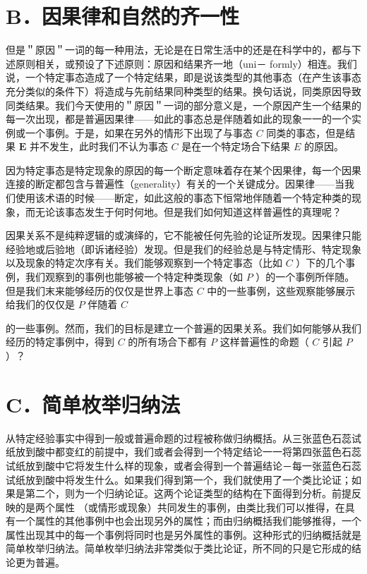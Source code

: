 \section*{B．因果律和自然的齐一性}
但是＂原因＂一词的每一种用法，无论是在日常生活中的还是在科学中的，都与下述原则相关，或预设了下述原则：原因和结果齐一地（uni－ formly）相连。我们说，一个特定事态造成了一个特定结果，即是说该类型的其他事态（在产生该事态充分类似的条件下）将造成与先前结果同种类型的结果。换句话说，同类原因导致同类结果。我们今天使用的＂原因＂一词的部分意义是，一个原因产生一个结果的每一次出现，都是普遍因果律——如此的事态总是伴随着如此的现象一一的一个实例或一个事例。于是，如果在另外的情形下出现了与事态 $C$ 同类的事态，但是结果 $\boldsymbol{E}$ 并不发生，此时我们不认为事态 $C$ 是在一个特定场合下结果 $E$ 的原因。

因为特定事态是特定现象的原因的每一个断定意味着存在某个因果律，每一个因果连接的断定都包含与普遍性（generality）有关的一个关键成分。因果律——当我们使用该术语的时候——断定，如此这般的事态下恒常地伴随着一个特定种类的现象，而无论该事态发生于何时何地。但是我们如何知道这样普遍性的真理呢？

因果关系不是纯粹逻辑的或演绎的，它不能被任何先验的论证所发现。因果律只能经验地或后验地（即诉诸经验）发现。但是我们的经验总是与特定情形、特定现象以及现象的特定次序有关。我们能够观察到一个特定事态（比如 $C$ ）下的几个事例，我们观察到的事例也能够被一个特定种类现象（如 $P$ ）的一个事例所伴随。但是我们末来能够经历的仅仅是世界上事态 $C$ 中的一些事例，这些观察能够展示给我们的仅仅是 $P$ 伴随着 $C$

的一些事例。然而，我们的目标是建立一个普遍的因果关系。我们如何能够从我们经历的特定事例中，得到 $C$ 的所有场合下都有 $P$ 这样普遍性的命题（ $C$ 引起 $P$ ）？

\section*{C．简单枚举归纳法}
从特定经验事实中得到一般或普遍命题的过程被称做归纳概括。从三张蓝色石蕊试纸放到酸中都变红的前提中，我们或者会得到一个特定结论一一将第四张蓝色石蕊试纸放到酸中它将发生什么样的现象，或者会得到一个普遍结论－每一张蓝色石蕊试纸放到酸中将发生什么。如果我们得到第一个，我们就使用了一个类比论证；如果是第二个，则为一个归纳论证。这两个论证类型的结构在下面得到分析。前提反映的是两个属性 （或情形或现象）共同发生的事例，由类比我们可以推得，在具有一个属性的其他事例中也会出现另外的属性；而由归纳概括我们能够推得，一个属性出现其中的每一个事例将同时也是另外属性的事例。这种形式的归纳概括就是简单枚举归纳法。简单枚举归纳法非常类似于类比论证，所不同的只是它形成的结论更为普遍。

